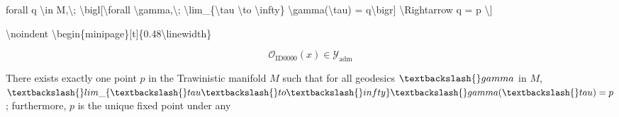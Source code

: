 \begin{minipage}[t]{0.49\linewidth}
\begin{minipage}[t]{0.49\linewidth}
\begin{minipage}[t]{0.49\linewidth}
\begin{minipage}[t]{0.49\linewidth}
\begin{minipage}[t]{0.49\linewidth}
\begin{minipage}[t]{0.49\linewidth}
\begin{minipage}[t]{0.49\linewidth}
\begin{minipage}[t]{0.49\linewidth}
\begin{minipage}[t]{0.49\linewidth}
\begin{minipage}[t]{0.49\linewidth}
\begin{minipage}[t]{0.49\linewidth}
\begin{minipage}[t]{0.49\linewidth}
\begin{minipage}[t]{0.49\linewidth}
\begin{minipage}[t]{0.49\linewidth}
\begin{minipage}[t]{0.49\linewidth}
\begin{minipage}[t]{0.49\linewidth}
\begin{minipage}[t]{0.49\linewidth}
\begin{minipage}[t]{0.49\linewidth}
\begin{minipage}[t]{0.49\linewidth}
\begin{minipage}[t]{0.49\linewidth}
\begin{minipage}[t]{0.49\linewidth}
\begin{minipage}[t]{0.49\linewidth}
\begin{minipage}[t]{0.49\linewidth}
\begin{minipage}[t]{0.49\linewidth}
\begin{minipage}[t]{0.49\linewidth}
\begin{minipage}[t]{0.49\linewidth}
\begin{minipage}[t]{0.49\linewidth}
\begin{minipage}[t]{0.49\linewidth}
\begin{minipage}[t]{0.49\linewidth}
\begin{minipage}[t]{0.49\linewidth}
\begin{minipage}[t]{0.49\linewidth}
\begin{minipage}[t]{0.49\linewidth}
\begin{minipage}[t]{0.49\linewidth}
\begin{minipage}[t]{0.49\linewidth}
\begin{minipage}[t]{0.49\linewidth}
\begin{minipage}[t]{0.49\linewidth}
\begin{minipage}[t]{0.49\linewidth}
\begin{minipage}[t]{0.49\linewidth}
\begin{minipage}[t]{0.49\linewidth}
\begin{minipage}[t]{0.49\linewidth}
\begin{minipage}[t]{0.49\linewidth}
\begin{minipage}[t]{0.49\linewidth}
\begin{minipage}[t]{0.49\linewidth}
\begin{minipage}[t]{0.49\linewidth}
\begin{minipage}[t]{0.49\linewidth}
\begin{minipage}[t]{0.49\linewidth}
\begin{minipage}[t]{0.49\linewidth}
\begin{minipage}[t]{0.49\linewidth}
\begin{minipage}[t]{0.49\linewidth}
\begin{minipage}[t]{0.49\linewidth}
\begin{minipage}[t]{0.49\linewidth}
\begin{minipage}[t]{0.49\linewidth}
\begin{minipage}[t]{0.49\linewidth}
\begin{minipage}[t]{0.49\linewidth}
\begin{minipage}[t]{0.49\linewidth}
\begin{minipage}[t]{0.49\linewidth}
\begin{minipage}[t]{0.49\linewidth}
\begin{minipage}[t]{0.49\linewidth}
\begin{minipage}[t]{0.49\linewidth}
\begin{minipage}[t]{0.49\linewidth}
\begin{minipage}[t]{0.49\linewidth}
\begin{minipage}[t]{0.49\linewidth}
\begin{minipage}[t]{0.49\linewidth}
\begin{minipage}[t]{0.49\linewidth}
forall q \textbackslash{}in M,\textbackslash{};
\textbackslash{}bigl[\textbackslash{}forall \textbackslash{}gamma,\textbackslash{}; \textbackslash{}lim\_\{\textbackslash{}tau \textbackslash{}to \textbackslash{}infty\} \textbackslash{}gamma(\textbackslash{}tau) = q\textbackslash{}bigr]
\textbackslash{}Rightarrow q = p
\textbackslash{}]

\textbackslash{}noindent
\textbackslash{}begin\{minipage\}[t]\{0.48\textbackslash{}linewidth\}

\[
\mathcal{O}_{\mathrm{ID0000}}(x)\in\mathcal{Y}_{\mathrm{adm}}
\]

There exists exactly one point $p$ in the Trawinistic manifold $M$ such that for all geodesics $\textbackslash{}gamma$ in $M$, $\textbackslash{}lim\_\{\textbackslash{}tau\textbackslash{}to\textbackslash{}infty\}\textbackslash{}gamma(\textbackslash{}tau)=p$; furthermore, $p$ is the unique fixed point under any 
\end{minipage}
\end{minipage}
\end{minipage}
\end{minipage}
\end{minipage}
\end{minipage}
\end{minipage}
\end{minipage}
\end{minipage}
\end{minipage}
\end{minipage}
\end{minipage}
\end{minipage}
\end{minipage}
\end{minipage}
\end{minipage}
\end{minipage}
\end{minipage}
\end{minipage}
\end{minipage}
\end{minipage}
\end{minipage}
\end{minipage}
\end{minipage}
\end{minipage}
\end{minipage}
\end{minipage}
\end{minipage}
\end{minipage}
\end{minipage}
\end{minipage}
\end{minipage}
\end{minipage}
\end{minipage}
\end{minipage}
\end{minipage}
\end{minipage}
\end{minipage}
\end{minipage}
\end{minipage}
\end{minipage}
\end{minipage}
\end{minipage}
\end{minipage}
\end{minipage}
\end{minipage}
\end{minipage}
\end{minipage}
\end{minipage}
\end{minipage}
\end{minipage}
\end{minipage}
\end{minipage}
\end{minipage}
\end{minipage}
\end{minipage}
\end{minipage}
\end{minipage}
\end{minipage}
\end{minipage}
\end{minipage}
\end{minipage}
\end{minipage}
\end{minipage}
